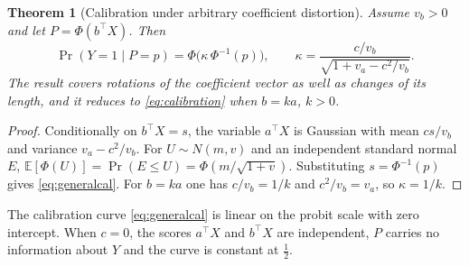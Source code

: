 \documentclass[11pt]{article}
\newtheorem{theorem}{Theorem}[section]
\theoremstyle{remark}
\newcommand{\E}{\mathbb E}
\newcommand{\1}{\mathbf 1}
\begin{document}
\begin{theorem}[Calibration under arbitrary coefficient distortion]\label{th:generalcal}
Assume $v_b>0$ and let $P=\Phi(b^\top X)$. Then
\begin{equation}\label{eq:generalcal}
 \Pr(Y=1\mid P=p)=\Phi\big(\kappa\,\Phi^{-1}(p)\big),\qquad
 \kappa=\frac{c/v_b}{\sqrt{1+v_a-c^2/v_b}} .
\end{equation}
The result covers rotations of the coefficient vector as well as changes of its length, and it reduces to \eqref{eq:calibration} when $b=ka$, $k>0$.
\end{theorem}
\begin{proof}
Conditionally on $b^\top X=s$, the variable $a^\top X$ is Gaussian with mean $cs/v_b$ and variance $v_a-c^2/v_b$. For $U\sim N(m,v)$ and an independent standard normal $E$, $\E[\Phi(U)]=\Pr(E\le U)=\Phi(m/\sqrt{1+v})$. Substituting $s=\Phi^{-1}(p)$ gives \eqref{eq:generalcal}. For $b=ka$ one has $c/v_b=1/k$ and $c^2/v_b=v_a$, so $\kappa=1/k$.
\end{proof}

The calibration curve \eqref{eq:generalcal} is linear on the probit scale with zero intercept. When $c=0$, the scores $a^\top X$ and $b^\top X$ are independent, $P$ carries no information about $Y$ and the curve is constant at $\tfrac12$.
\end{document}
